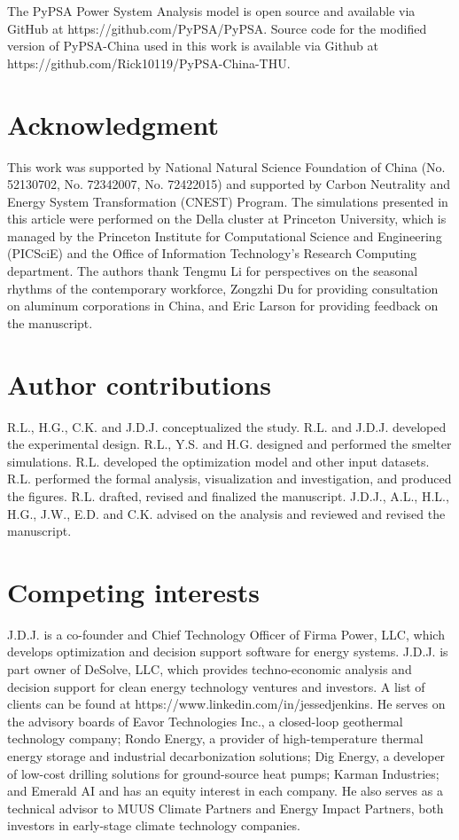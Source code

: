 \documentclass[preprint]{elsarticle}
\begin{document}
The PyPSA Power System Analysis model is open source and available via GitHub at https://github.com/PyPSA/PyPSA. Source code for the modified version of PyPSA-China used in this work is available via Github at https://github.com/Rick10119/PyPSA-China-THU.


\section*{Acknowledgment}
This work was supported by National Natural Science Foundation of China (No. 52130702, No. 72342007, No. 72422015) and supported by Carbon Neutrality and Energy System Transformation (CNEST) Program.
The simulations presented in this article were performed on the Della cluster at Princeton University, which is managed by the Princeton Institute for Computational Science and Engineering (PICSciE) and the Office of Information Technology's Research Computing department.
The authors thank Tengmu Li for perspectives on the seasonal rhythms of the contemporary workforce, Zongzhi Du for providing consultation on aluminum corporations in China, and Eric Larson for providing feedback on the manuscript.

\section*{Author contributions}
R.L., H.G., C.K. and J.D.J. conceptualized the study. R.L. and J.D.J. developed the experimental design. R.L., Y.S. and H.G. designed and performed the smelter simulations. R.L. developed the optimization model and other input datasets. R.L. performed the formal analysis, visualization and investigation, and produced the figures. R.L. drafted, revised and finalized the manuscript. J.D.J., A.L., H.L., H.G., J.W., E.D. and C.K. advised on the analysis and reviewed and revised the manuscript.

\section*{Competing interests}

J.D.J. is a co-founder and Chief Technology Officer of Firma Power, LLC, which develops optimization and decision support software for energy systems. J.D.J. is part owner of DeSolve, LLC, which provides techno-economic analysis and decision support for clean energy technology ventures and investors. A list of clients can be found at https://www.linkedin.com/in/jessedjenkins. He serves on the advisory boards of Eavor Technologies Inc., a closed-loop geothermal technology company; Rondo Energy, a provider of high-temperature thermal energy storage and industrial decarbonization solutions; Dig Energy, a developer of low-cost drilling solutions for ground-source heat pumps; Karman Industries; and Emerald AI and has an equity interest in each company. He also serves as a technical advisor to MUUS Climate Partners and Energy Impact Partners, both investors in early-stage climate technology companies.
\end{document}
